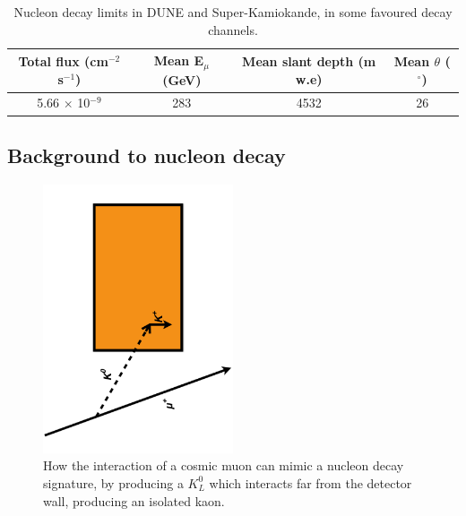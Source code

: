 \begin{table}[h!]
\caption[Nucleon decay limits in DUNE and Super-Kamiokande]
        {Nucleon decay limits in DUNE and Super-Kamiokande, in some favoured decay channels.}
\centering
\label{tab:NDKLim}
\begin{tabular}{c c c c}
\toprule
{Total flux (cm$^{-2}$ s$^{-1}$)} & {Mean E$_{\mu}$ (GeV)} & {Mean slant depth (m w.e)} & {Mean $\theta$ ($^{\circ}$)} \\ 
\midrule
5.66 $\times$ 10$^{-9}$           & 283                    & 4532                       & 26                           \\
\bottomrule
\end{tabular}
\end{table}

\subsection{Background to nucleon decay} \label{sec:BkNDK}  %

\begin{figure}[h!]
  \centering
  \includegraphics[width=0.5\textwidth]{KaonNDKInteraction}
  \caption[How the interaction of a cosmic muon can mimic a nucleon decay signature]
          {How the interaction of a cosmic muon can mimic a nucleon decay signature, by producing a $K^{0}_{L}$ which interacts far from the detector wall, producing an isolated kaon.}
  \label{fig:K0LongBackground}
\end{figure}

